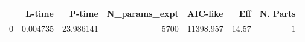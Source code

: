 \begin{tabular}{lrrrrrr}
\toprule
{} &    L-time &     P-time &  N\_params\_expt &   AIC-like &    Eff &  N. Parts \\
\midrule
0 &  0.004735 &  23.986141 &           5700 &  11398.957 &  14.57 &         1 \\
\bottomrule
\end{tabular}
